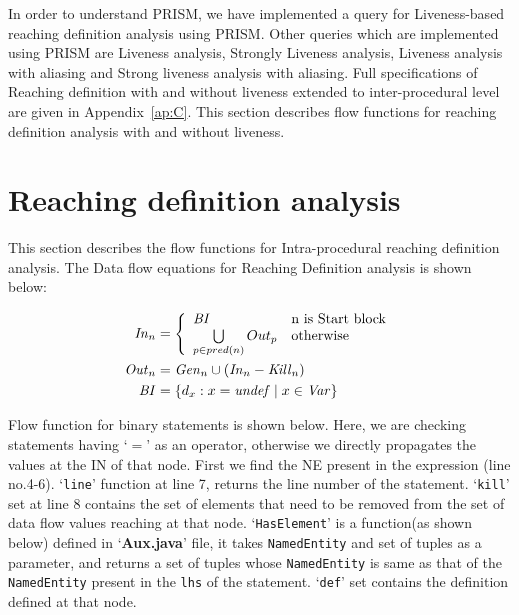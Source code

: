 \documentclass[11pt,a4paper,openright]{report}
\begin{document}
In order to understand PRISM, we have implemented a query for Liveness-based reaching definition analysis using PRISM. Other queries which are 
implemented using PRISM are Liveness analysis, Strongly Liveness analysis, Liveness analysis with aliasing and Strong liveness analysis with aliasing.
Full specifications of Reaching definition with and without liveness extended to inter-procedural level are given in Appendix~\ref{ap:C}. This section describes flow functions for reaching definition analysis with and without
liveness.

\section{Reaching definition analysis}
This section describes the flow functions for Intra-procedural reaching definition analysis.
The Data flow equations for Reaching Definition analysis is shown below:

\begin{equation}
\begin{split}
\mbox{\textit{In}}_n &= \left\{ \begin{array}{ll}
	  \mbox{\textit{BI}} & \mbox{n is Start block}\\
	  \bigcup\limits_{p \in pred(n)} Out_p & \mbox{otherwise}
	  \end{array} \right.\\ 
\mbox{\textit{Out}}_n &= \mbox{\textit{Gen}}_n \cup (\mbox{\textit{In}}_n - \mbox{\textit{Kill}}_n) \\
\mbox{\textit{BI}} &= \{d_x : x = \mbox{\textit{undef}} \mid x \in \mbox{\textit{Var}}\} \\
\end{split} 
\end{equation}
  
Flow function for binary statements is shown below. Here, we are checking statements having `$=$' as an operator, otherwise we  
directly propagates the values at the IN of that node. First we find the NE present in the expression (line no.4-6). `\texttt{line}'
 function at line 7, returns the line number of the statement. `\texttt{kill}' set at line 8 contains the set of elements that need 
 to be removed from the set of data flow values reaching at that node. `\texttt{HasElement}' is a function(as shown below) defined in
`\textbf{Aux.java}' file, it takes \texttt{NamedEntity} and set of tuples as a parameter, and returns a set of tuples whose \texttt{NamedEntity} is same
as that of the \texttt{NamedEntity} present in the \texttt{lhs} of the statement. `\texttt{def}' set contains the definition defined at that node.
\end{document}
